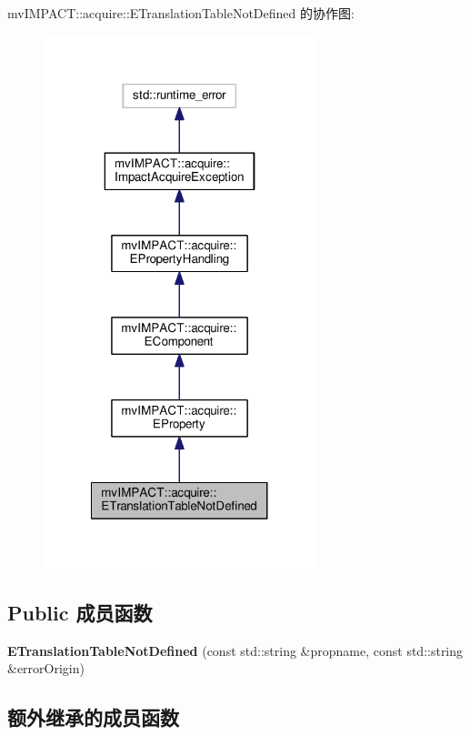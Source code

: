 mv\+I\+M\+P\+A\+C\+T\+:\+:acquire\+:\+:E\+Translation\+Table\+Not\+Defined 的协作图\+:
\nopagebreak
\begin{figure}[H]
\begin{center}
\leavevmode
\includegraphics[width=224pt]{classmv_i_m_p_a_c_t_1_1acquire_1_1_e_translation_table_not_defined__coll__graph}
\end{center}
\end{figure}
\subsection*{Public 成员函数}
\begin{DoxyCompactItemize}
\item 
\hypertarget{classmv_i_m_p_a_c_t_1_1acquire_1_1_e_translation_table_not_defined_a70e934ba0faa90a528fce1a6a8897f09}{{\bfseries E\+Translation\+Table\+Not\+Defined} (const std\+::string \&propname, const std\+::string \&error\+Origin)}\label{classmv_i_m_p_a_c_t_1_1acquire_1_1_e_translation_table_not_defined_a70e934ba0faa90a528fce1a6a8897f09}

\end{DoxyCompactItemize}
\subsection*{额外继承的成员函数}


